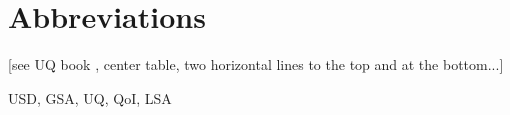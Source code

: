 

\section*{Abbreviations} %
\thispagestyle{plain} %


[see UQ book , center table, two horizontal lines to the top and at the bottom...]


USD, GSA, UQ, QoI, LSA
